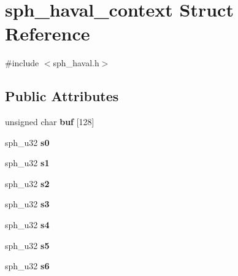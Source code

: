 \hypertarget{structsph__haval__context}{}\section{sph\+\_\+haval\+\_\+context Struct Reference}
\label{structsph__haval__context}


{\ttfamily \#include $<$sph\+\_\+haval.\+h$>$}

\subsection*{Public Attributes}
\begin{DoxyCompactItemize}
\item 
\mbox{\label{structsph__haval__context_accb84917db1b29fce278d2ad7b05216a}} 
unsigned char {\bfseries buf} \mbox{[}128\mbox{]}
\item 
\mbox{\label{structsph__haval__context_af2a78751631514be64ff7d771a607492}} 
sph\+\_\+u32 {\bfseries s0}
\item 
\mbox{\label{structsph__haval__context_a4edf411a64b7ea1b861a70cec407fb18}} 
sph\+\_\+u32 {\bfseries s1}
\item 
\mbox{\label{structsph__haval__context_aa8713f9970ba19667607e3fae3d14fb6}} 
sph\+\_\+u32 {\bfseries s2}
\item 
\mbox{\label{structsph__haval__context_a706f3cf004f5370aceeec1ad07b93019}} 
sph\+\_\+u32 {\bfseries s3}
\item 
\mbox{\label{structsph__haval__context_a998d11706b0105bb9dbbc8c21314ce5d}} 
sph\+\_\+u32 {\bfseries s4}
\item 
\mbox{\label{structsph__haval__context_a67f3c9114cb0315bef732ac49c92a3ec}} 
sph\+\_\+u32 {\bfseries s5}
\item 
\mbox{\label{structsph__haval__context_a7c9b6cc54ea1193205d64cceaf4fdc2e}} 
sph\+\_\+u32 {\bfseries s6}
\item 
\mbox{\label{structsph__haval__context_adfdc11b979dfaf2d3e1c6b43b20908d4}} 

\end{DoxyCompactItemize}
